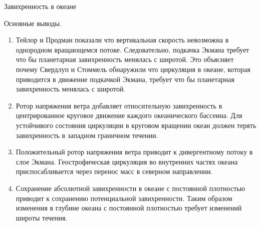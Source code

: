 \begin{chapter}{Завихренность в океане}
\begin{section}{Основные выводы.}
\begin{enumerate}
\item
Тейлор и Продман показали что вертикальная скорость невозможна в
однородном вращающемся потоке. Следовательно, подкачка Экмана требует
что бы планетарная завихренность менялась с широтой. Это объясняет
почему Свердлуп и Стоммель обнаружили что циркуляция в океане, которая
приводится в движение подкачкой Экмана, требует что бы планетарная
завихренность менялась с широтой.
%

\item
Ротор напряжения ветра добавляет относительную завихренность в
центрированное круговое движение каждого океанического бассеина. Для
устойчивого состояния циркуляции в круговом вращении океан должен
терять завихренность в западном граничном течении.
%

\item
Положительный ротор напряжения ветра приводит к дивергентному потоку в
слое Экмана. Геострофическая циркуляция во внутренних частях океана
приспосабливается через перенос масс в северном направлении.
%

\item
Сохранение абсолютной завихренности в океане с постоянной плотностью
приводит к сохранению потенциальной завихренности. Таким образом
изменения в глубине океана с постоянной плотностью требует изменений
широты течения.
%
\end{enumerate}
\end{section}
\end{chapter}